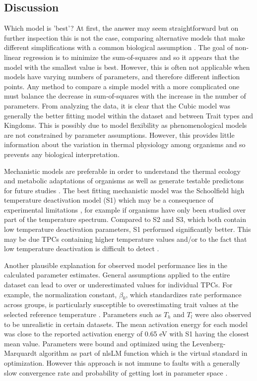 \documentclass[11pt]{article}
\begin{document}
\begin{linenumbers}
\section{Discussion}

Which model is 'best'? At first, the answer may seem straightforward but on further inspection this is not the case, comparing alternative models that make different simplifications with a common biological assumption \cite{article}. The goal of non-linear regression is to minimize the sum-of-squares and so it appears that the model with the smallest value is best. However, this is often not applicable when  models have varying numbers of parameters, and therefore different inflection points. Any method to compare a simple model with a more complicated one must balance the decrease in sum-of-squares with the increase in the number of parameters. From analyzing the data, it is clear that the Cubic model was generally the better fitting model within the dataset and between Trait types and Kingdoms. This is possibly due to model flexibility as phenomenological models are not constrained by parameter assumptions. However, this provides little information about the variation in thermal physiology among organisms and so prevents any biological interpretation. 

Mechanistic models are preferable in order to understand the thermal ecology and metabolic adaptations of organisms as well as generate testable predictons for future studies
\cite{article4}\cite{Schulte2015TheEO} \cite{Martin2017PhenomenologicalVB} \cite{delong2017combined}. The best fitting mechanistic model was the Schoolfield high temperature deactivation model (S1) which may be a consequence of experimental limitations \cite{schoolfield1981non}, for example if organisms have only been studied over part of the temperature spectrum. Compared to S2 and S3, which both contain low temperature deactivation parameters, S1 performed significantly better. This may be due TPCs containing higher temperature values and/or to the fact that low temperature deactivation is difficult to detect \cite{pawar2016real}.

Another plausible explanation for observed model performance lies in the calculated parameter estimates. General assumptions applied to the entire dataset can lead to over or underestimated values for individual TPCs. For example, the normalization constant, \(\beta_0\), which standardizes rate performance across groups, is particularly susceptible to overestimating trait values at the selected reference temperature \cite{kontopoulos2018use}. Parameters such as \(T_h\) and \(T_l\) were also observed to be unrealistic in certain datasets. The mean activation energy for each model was close to the reported activation energy of 0.65 eV with S1 having the closest mean value. Parameters were bound and optimized using the Levenberg-Marquardt algorithm as part of nlsLM function which is the virtual standard in optimization. However this approach is not immune to faults with a generally slow convergence rate and probability of getting lost in parameter space \cite{article14}.


\end{linenumbers}
\end{document}
